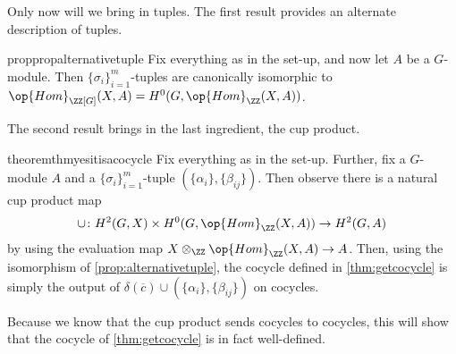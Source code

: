 \documentclass{article}
\numberwithin{equation}{section}
\begin{document}
Only now will we bring in tuples. The first result provides an alternate description of tuples.
\begin{restatable}{prop}{propalternativetuple} \label{prop:alternativetuple}
	Fix everything as in the set-up, and now let $A$ be a $G$-module. Then $\{\sigma_i\}_{i=1}^m$-tuples are canonically isomorphic to $\op{Hom}_{\ZZ[G]}(X,A)=H^0(G,\op{Hom}_\ZZ(X,A))$.
\end{restatable}
\noindent The second result brings in the last ingredient, the cup product.
\begin{restatable}{theorem}{thmyesitisacocycle} \label{thm:yesitisacocycle}
	Fix everything as in the set-up. Further, fix a $G$-module $A$ and a $\{\sigma_i\}_{i=1}^m$-tuple $\left(\{\alpha_i\},\{\beta_{ij}\}\right)$. Then observe there is a natural cup product map
	\[\cup\colon H^2(G,X)\times H^0(G,\op{Hom}_\ZZ(X,A))\to H^2(G,A)\]
	by using the evaluation map $X\otimes_\ZZ\op{Hom}_\ZZ(X,A)\to A$. Then, using the isomorphism of \autoref{prop:alternativetuple}, the cocycle defined in \autoref{thm:getcocycle} is simply the output of $\delta(\overline c)\cup\left(\{\alpha_i\},\{\beta_{ij}\}\right)$ on cocycles.
\end{restatable}
\noindent Because we know that the cup product sends cocycles to cocycles, this will show that the cocycle of \autoref{thm:getcocycle} is in fact well-defined.

\end{document}
